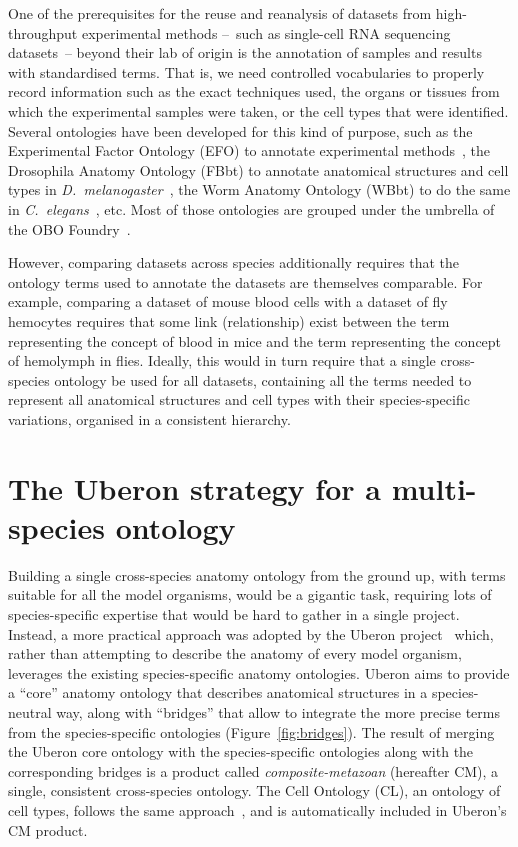 \documentclass{ceurart}
\def\species#1{\textit{#1}}
\begin{document}
One of the prerequisites for the reuse and reanalysis of datasets from
high-throughput experimental methods --~such as single-cell RNA
sequencing datasets~-- beyond their lab of origin is the annotation of
samples and results with standardised terms. That is, we need controlled
vocabularies to properly record information such as the exact techniques
used, the organs or tissues from which the experimental samples were
taken, or the cell types that were identified. Several ontologies have
been developed for this kind of purpose, such as the Experimental Factor
Ontology (EFO) to annotate experimental methods~\cite{malone2010}, the
Drosophila Anatomy Ontology (FBbt) to annotate anatomical structures and
cell types in \species{D.~melanogaster}~\cite{costa2013}, the Worm
Anatomy Ontology (WBbt) to do the same in
\species{C.~elegans}~\cite{lee2003}, etc. Most of those ontologies are
grouped under the umbrella of the OBO Foundry~\cite{jackson2021}.

However, comparing datasets across species additionally requires that
the ontology terms used to annotate the datasets are themselves
comparable. For example, comparing a dataset of mouse blood cells with a
dataset of fly hemocytes requires that some link (relationship) exist
between the term representing the concept of blood in mice and the term
representing the concept of hemolymph in flies. Ideally, this would in
turn require that a single cross-species ontology be used for all
datasets, containing all the terms needed to represent all anatomical
structures and cell types with their species-specific variations,
organised in a consistent hierarchy.

\section{The Uberon strategy for a multi-species ontology}

Building a single cross-species anatomy ontology from the ground up,
with terms suitable for all the model organisms, would be a gigantic
task, requiring lots of species-specific expertise that would be hard to
gather in a single project.  Instead, a more practical approach was
adopted by the Uberon project~\cite{mungall2012a} which, rather than
attempting to describe the anatomy of every model organism, leverages
the existing species-specific anatomy ontologies. Uberon aims to provide
a ``core'' anatomy ontology that describes anatomical structures in a
species-neutral way, along with ``bridges'' that allow to integrate the
more precise terms from the species-specific ontologies
(Figure~\ref{fig:bridges}). The result of merging the Uberon core
ontology with the species-specific ontologies along with the
corresponding bridges is a product called \emph{composite-metazoan}
(hereafter CM), a single, consistent cross-species ontology. The Cell
Ontology (CL), an ontology of cell types, follows the same
approach~\cite{diehl2016}, and is automatically included in Uberon's CM
product.
\end{document}
